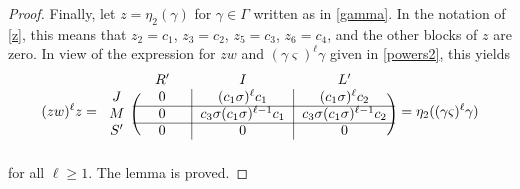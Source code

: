 \documentclass[11pt]{article}
\theoremstyle{definition}
\numberwithin{equation}{section}
\begin{document}
\begin{proof}
Finally, let $z=\eta_2(\gamma)$ for $\gamma\in\Gamma$ written as in \eqref{gamma}.
In the notation of \eqref{z}, this means that $z_2=c_1$, $z_3=c_2$, $z_5=c_3$, $z_6=c_4$, and the other blocks of $z$ are zero. In view of the expression for $zw$ and $(\gamma\varsigma)^\ell\gamma$ given in \eqref{powers2}, this yields
\[(zw)^\ell z=\begin{blockarray}{cccc}
{} & {\quad R'\quad} & {\quad I\quad} & {\quad L'\quad}\\
\begin{block}{c(c|c|c)}
J & 0 & (c_1\sigma)^\ell c_1 & (c_1\sigma)^{\ell}c_2\\
\cline{2-4}
M & 0 & c_3\sigma(c_1\sigma)^{\ell-1}c_1 & c_3\sigma(c_1\sigma)^{\ell-1}c_2\\
\cline{2-4}
S' & 0 & 0 & 0\\
\end{block}
\end{blockarray}\,=\eta_2((\gamma\varsigma)^\ell\gamma)\]
for all $\ell\geq 1$. The lemma is proved.
\end{proof}
\end{document}

